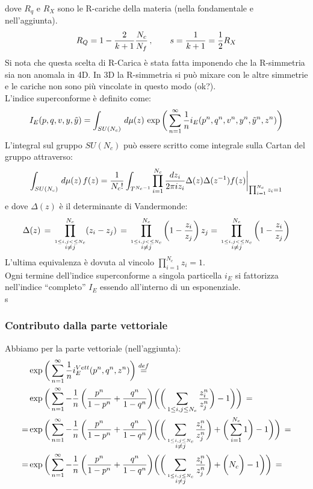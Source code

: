 \documentclass[a4paper,12pt]{article}
\begin{document}
dove $R_q$ e $R_X$ sono le R-cariche della materia (nella fondamentale e nell'aggiunta).
\begin{equation}
R_Q =1-{2\over k+1}{N_c\over N_f} \, , \qquad s = {1 \over k+1} = {1 \over 2 } R_X  \\
\end{equation}
Si nota che questa scelta di R-Carica è stata fatta imponendo che la R-simmetria sia non anomala in 4D. In 3D la R-simmetria si può mixare con le altre simmetrie e le cariche non sono più vincolate in questo modo (ok?).\\
 L'indice superconforme è definito come:
 \begin{equation*}
 I_E (p,q,v, y,\tilde y) = \int_{SU(N_c)}\, d \mu(z) \, \exp \bigg( \sum_{n=1}^{\infty} {1 \over n} i_E (p^n,q^n,v^n, y^n,\tilde y^n,z^n) \bigg)
 \end{equation*}
 L'integral sul gruppo $SU(N_c)$ può essere scritto come integrale sulla Cartan del gruppo attraverso:
 \begin{equation}
  \int_{SU(N_c)}\, d \mu(z) \, f(z) = {1 \over N_c!} \int_{T^{N_c-1}} \prod_{i=1}^{N_c }
  { d z_i \over { 2 \pi i z_i} } \Delta (z) \Delta (z^{-1}) f(z) \bigg \rvert_{\prod_{i=1}^{N_c} z_i = 1}
 \end{equation}
 e dove $\Delta (z) $ è il determinante di Vandermonde:
 $$
 \Delta (z ) \, = \, \prod_{ \overset{1 \leq i,j< \leq N_c} { i \neq j}}^{N_c} ( z_i - z_j) \, = \,  \prod_{ \overset{1 \leq i,j< \leq N_c} { i \neq j}}^{N_c}\bigg ( 1 - {z_i \over  z_j } \bigg) \, z_j = \,  \prod_{ \overset{1 \leq i,j< \leq N_c} { i \neq j}}^{N_c}\bigg ( 1 - {z_i \over  z_j } \bigg)
 $$
 L'ultima equivalenza è dovuta al vincolo $ \prod_{i=1}^{N_c} z_i = 1$.
 \\
 Ogni termine dell'indice superconforme a singola particella $i_E$ si fattorizza nell'indice ``completo'' $I_E$ essendo all'interno di un esponenziale.\\
s \subsubsection{Contributo dalla parte vettoriale}
 Abbiamo per la parte vettoriale (nell'aggiunta):
 \begin{align*} &\exp \bigg( \sum_{n=1}^{\infty} {1 \over n} i_E^{Vett} (p^n,q^n,z^n) \bigg) \overset{def}{=} \\
 &\exp \bigg( \sum_{n=1}^{\infty} - {1 \over n} \, \bigg( {p^n \over 1-p^n} + {q^n \over 1-q^n} \bigg)  \bigg(\bigg( \sum_{ 1 \leq i,j \leq N_c}  {z_i^n \over z_j^n}  \bigg)- 1 \bigg) \bigg) \, = \\
 =&\exp \bigg( \sum_{n=1}^{\infty} - {1 \over n} \, \bigg( {p^n \over 1-p^n} + {q^n \over 1-q^n} \bigg)  \bigg( \bigg( \sum_{\overset{ 1 \leq i,j \leq N_c}{i \neq j}}  {z_i^n \over z_j^n} \bigg) + \bigg( \sum_{i=1}^{N_c} 1 \bigg)- 1 \bigg) \bigg) \, = \\
  =&\exp \bigg( \sum_{n=1}^{\infty} - {1 \over n} \, \bigg( {p^n \over 1-p^n} + {q^n \over 1-q^n} \bigg)  \bigg( \bigg( \sum_{\overset{ 1 \leq i,j \leq N_c}{i \neq j}}  {z_i^n \over z_j^n} \bigg) + \bigg( N_c \bigg)- 1 \bigg) \bigg) \, = \\
  \end{align*}
\end{document}

